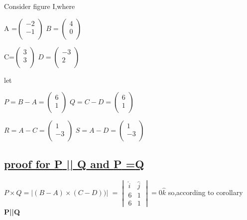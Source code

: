 \documentclass[journal,12pt,twocolumn]{IEEEtran}
\begin{document}
Consider  figure I,where

\boldmath
A =$\begin{pmatrix}-2 \\ -1 \\ \end{pmatrix}$ \hspace{0.3cm} $ B=\begin{pmatrix} 4\\ 0 \\ \end{pmatrix}$ 

C=$\begin{pmatrix}3 \\ 3 \\ \end{pmatrix}$ \hspace{0.3cm} $ D=\begin{pmatrix}-3 \\ 2 \\ \end{pmatrix}$ 
\vspace{0.2cm}


let

$ P =B-A=\begin{pmatrix}6 \\ 1 \\ \end{pmatrix}$ \hspace{0.3cm}$ Q=C-D=\begin{pmatrix}6 \\ 1 \\ \end{pmatrix}$ 

$ R=A-C=\begin{pmatrix}1 \\ -3 \\ \end{pmatrix}$ \hspace{0.3cm}$ S=A-D=\begin{pmatrix}1 \\ -3 \\ \end{pmatrix}$ 
\unboldmath

\subsection{\underline{proof for  \textbf{P} || \textbf{Q} and \textbf{P} =\textbf{Q}}}
\boldmath
$ P\times Q=|(B-A)\times (C-D))|$
$ = \begin{vmatrix}
           \hat{i} & \hat{j}\\
            6 & 1\\
            6 & 1
    \end{vmatrix} = {0\hat{k}}  $
\unboldmath  
\vspace{0.2cm}
so,according to corollary \textbf{P||Q}
\end{document}
